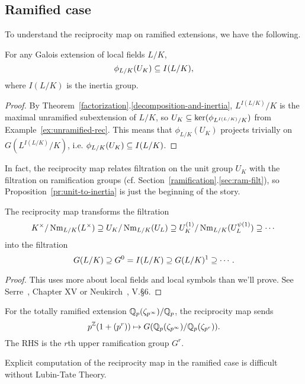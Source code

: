 \subsection{Ramified case}
To understand the reciprocity map on ramified extensions, we have the following.
\begin{pr}
For any Galois extension of local fields $L/K$, 
\[\phi_{L/K}(U_K)\subseteq I(L/K),\]
where $I(L/K)$ is the inertia group.
\end{pr}
\begin{proof}
By Theorem~\ref{factorization}.\ref{decomposition-and-inertia}, $L^{I(L/K)}/K$ is the maximal unramified subextension of $L/K$,  so $U_K\subseteq \ker(\phi_{L^{I(L/K)}/K})$ from Example~\ref{ex:unramified-rec}. This means that $\phi_{L/K}(U_K)$ projects trivially on $G(L^{I(L/K)}/K)$, i.e. $\phi_{L/K}(U_K)\subseteq I(L/K)$.
\end{proof}
In fact, the reciprocity map relates filtration on the unit group $U_K$ with the filtration on ramification groups (cf. Section~\ref{ramification}.\ref{sec:ram-filt}), so Proposition~\ref{pr:unit-to-inertia} is just the beginning of the story.
\begin{thm}
The reciprocity map transforms the filtration
\[
K^{\times}/\operatorname{Nm}_{L/K}(L^{\times})\supseteq U_K/\operatorname{Nm}_{L/K}(U_L)\supseteq U_K^{(1)}/\operatorname{Nm}_{L/K}(U_L^{\psi(1)})\supseteq \cdots
\]
into the filtration
\[
G(L/K)\supseteq G^0=I(L/K)\supseteq G(L/K)^1\supseteq \cdots.
\]
\end{thm}
\begin{proof}
This uses more about local fields and local symbols than we'll prove. See Serre~\cite{Se79}, Chapter XV or Neukirch~\cite{Ne99}, V.\S6.
\end{proof}
\begin{ex}
For the totally ramified extension $\mathbb{Q}_p(\zeta_{p^{\infty}})/\mathbb{Q}_p$, the reciprocity map sends
\[
p^{\mathbb{Z}}(1+(p^r))\mapsto G(\mathbb{Q}_p(\zeta_{p^{\infty}})/\mathbb{Q}_p(\zeta_{p^r})).
\]
The RHS is the $r$th upper ramification group $G^r$.
\end{ex}
Explicit computation of the reciprocity map in the ramified case is difficult without Lubin-Tate Theory.
